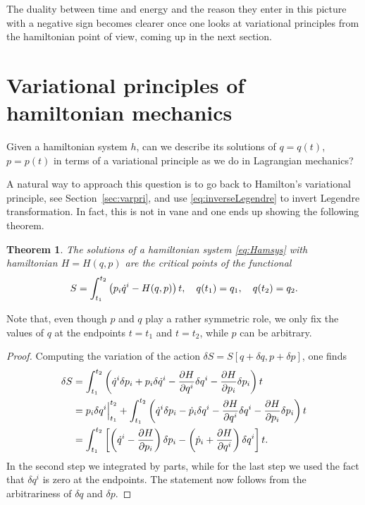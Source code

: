 \documentclass[english,fontsize=11pt,paper=a5,oneside]{scrbook}
\let\d\relax
\newcommand{\d}{\mathrm{d}}
\newtheorem{theorem}{Theorem}[chapter]
\theoremstyle{definition}
\begin{document}
The duality between time and energy and the reason they enter in this picture with a negative sign becomes clearer once one looks at variational principles from the hamiltonian point of view, coming up in the next section.

\section{Variational principles of hamiltonian mechanics}

Given a hamiltonian system $h$, can we describe its solutions of $q=q(t)$, $p=p(t)$ in terms of a variational principle as we do in Lagrangian mechanics?

A natural way to approach this question is to go back to Hamilton's variational principle, see Section~\ref{sec:varpri}, and use \eqref{eq:inverseLegendre} to invert Legendre transformation.
In fact, this is not in vane and one ends up showing the following theorem.

\begin{theorem}\label{thm:variationalHamilton}
  The solutions of a hamiltonian system \eqref{eq:Hamsys} with hamiltonian $H=H(q,p)$ are the critical points of the functional
  \begin{equation}\label{eq:variationalHamilton}
    S = \int_{t_1}^{t_2} \left(p_i\dot q^i - H(q,p)\right) \d t,
    \quad q(t_1) = q_1, \quad q(t_2) = q_2.
  \end{equation}
\end{theorem}
Note that, even though $p$ and $q$ play a rather symmetric role, we only fix the values of $q$ at the endpoints $t=t_1$ and $t=t_2$, while $p$ can be arbitrary.

\begin{proof}
  Computing the variation of the action $\delta S = S[q+\delta q, p + \delta p]$, one finds
  \begin{align}
    \delta S
     & = \int_{t_1}^{t_2} \left( \dot q^i \delta p_i + p_i \delta \dot q^i - \frac{\partial H}{\partial q^i}\delta q^i - \frac{\partial H}{\partial p_i}\delta p_i \right) \d t                                   \\
     & = p_i \delta q^i\Big|_{t_1}^{t_2} + \int_{t_1}^{t_2} \left( \dot q^i \delta p_i - \dot p_i \delta q^i - \frac{\partial H}{\partial q^i}\delta q^i - \frac{\partial H}{\partial p_i}\delta p_i \right) \d t \\
     & = \int_{t_1}^{t_2} \left[
      \left(\dot q^i - \frac{\partial H}{\partial p_i} \right) \delta p_i
      - \left(\dot p_i + \frac{\partial H}{\partial q^i}\right) \delta q^i
      \right] \d t.
  \end{align}
  In the second step we integrated by parts, while for the last step we used the fact that $\delta q^i$ is zero at the endpoints.
  The statement now follows from the arbitrariness of $\delta q$ and $\delta p$.
\end{proof}
\end{document}

